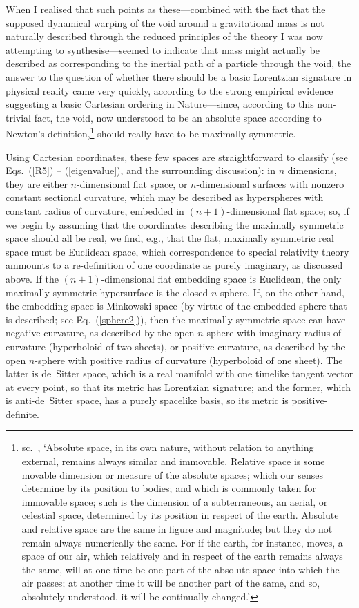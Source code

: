 When I realised that such points as these---combined with the fact that the supposed dynamical warping of the void around a gravitational mass is not naturally described through the reduced principles of the theory I was now attempting to synthesise---seemed to indicate that mass might actually be described as corresponding to the inertial path of a particle through the void, the answer to the question of whether there should be a basic Lorentzian signature in physical reality came very quickly, according to the strong empirical evidence suggesting a basic Cartesian ordering in Nature---since, according to this non-trivial fact, the void, now understood to be an absolute space according to Newton's definition,\footnote{sc.~\cite{Newton1966}, `Absolute space, in its own nature, without relation to anything external, remains always similar and immovable. Relative space is some movable dimension or measure of the absolute spaces; which our senses determine by its position to bodies; and which is commonly taken for immovable space; such is the dimension of a subterraneous, an aerial, or celestial space, determined by its position in respect of the earth. Absolute and relative space are the same in figure and magnitude; but they do not remain always numerically the same. For if the earth, for instance, moves, a space of our air, which relatively and in respect of the earth remains always the same, will at one time be one part of the absolute space into which the air passes; at another time it will be another part of the same, and so, absolutely understood, it will be continually changed.'} should really have to be maximally symmetric.

Using Cartesian coordinates, these few spaces are straightforward to classify (see Eqs.~(\ref{R5}) -- (\ref{eigenvalue}), and the surrounding discussion): in $n$ dimensions, they are either $n$-dimensional flat space, or $n$-dimensional surfaces with nonzero constant sectional curvature, which may be described as hyperspheres with constant radius of curvature, embedded in $(n+1)$-dimensional flat space; so, if we begin by assuming that the coordinates describing the maximally symmetric space should all be real, we find, e.g., that the flat, maximally symmetric real space must be Euclidean space, which correspondence to special relativity theory ammounts to a re-definition of one coordinate as purely imaginary, as discussed above. If the $(n+1)$-dimensional flat embedding space is Euclidean, the only maximally symmetric hypersurface is the closed $n$-sphere. If, on the other hand, the embedding space is Minkowski space (by virtue of the embedded sphere that is described; see Eq.~(\ref{sphere2})), then the maximally symmetric space can have negative curvature, as described by the open $n$-sphere with imaginary radius of curvature (hyperboloid of two sheets), or positive curvature, as described by the open $n$-sphere with positive radius of curvature (hyperboloid of one sheet). The latter is de~Sitter space, which is a real manifold with one timelike tangent vector at every point, so that its metric has Lorentzian signature; and the former, which is anti-de~Sitter space, has a purely spacelike basis, so its metric is positive-definite.

